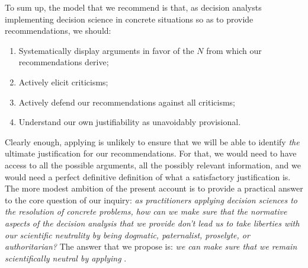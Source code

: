 \documentclass[preprint, french, english, 11pt, authoryear]{elsarticle}%
\newcommand{\ac}[1]{#1}
\newcommand{\commentOC}[1]{\textcolor{red}{OC: #1}}
\begin{document}
To sum up, the model that we recommend is that, as decision analysts implementing decision science in concrete situations so as to provide recommendations, we should:
\begin{enumerate}[label=\emph{\roman*}., ref=\textit{\roman*}]
\setlength{\itemsep}{0pt}
\setlength{\parskip}{0pt}
	\item \label{it:argue}Systematically display arguments in favor of the $N$ from which our recommendations derive;
	\item \label{it:criticize}Actively elicit criticisms;
	\item \label{it:defend}Actively defend our recommendations against all criticisms;
	\item \label{it:provisional}Understand our own justifiability as unavoidably provisional.
\end{enumerate}

Clearly enough, applying  is unlikely to ensure that we will be able to identify \emph{the} ultimate justification for our recommendations.
For that, we would need to have access to all the possible arguments, all the possibly relevant information, and we would need a perfect definitive definition of what a satisfactory justification is. 
The more modest ambition of the present account is to provide a practical answer to the core question of our inquiry: 
\emph{as practitioners applying decision sciences to the resolution of concrete problems, how can we make sure that the normative aspects of the decision analysis that we provide don't lead us to take liberties with our scientific neutrality by being dogmatic, paternalist, proselyte, or authoritarian?}
The answer that we propose is: \emph{we can make sure that we remain scientifically neutral by applying }.
\end{document}
